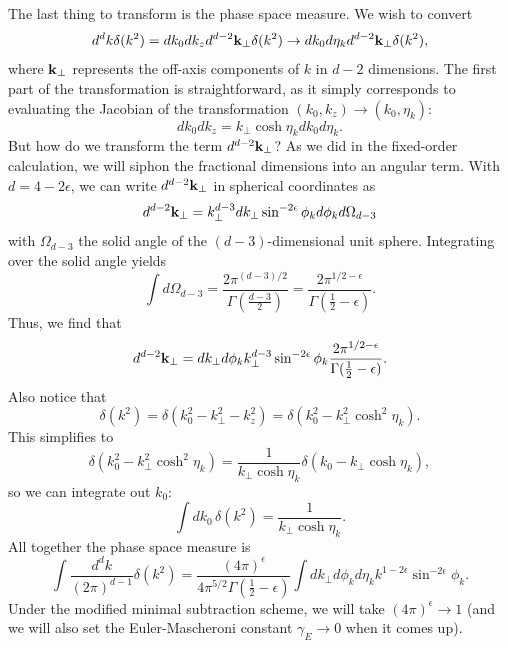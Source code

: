 \documentclass[../thesis.tex]{subfiles}
\begin{document}
	The last thing to transform is the phase space measure. We wish to convert
	\begin{equation}
		d^d k \delta(k^2) = dk_0 dk_z d^{d - 2}\vb{k}_\perp \delta(k^2) \to dk_0 d\eta_{k} d^{d - 2}\vb{k}_\perp \delta(k^2),
	\end{equation}
	where $\vb{k}_\perp$ represents the off-axis components of $k$ in $d - 2$ dimensions. The first part of the transformation is straightforward, as it simply corresponds to evaluating the Jacobian of the transformation $(k_0, k_z) \to (k_0, \eta_k)$:
	\begin{equation}
		dk_0 dk_z = k_\perp \cosh\eta_k dk_0 d\eta_k.
	\end{equation}
	But how do we transform the term $d^{d - 2}\vb{k}_\perp$? As we did in the fixed-order calculation, we will siphon the fractional dimensions into an angular term. With $d = 4 - 2\epsilon$, we can write $d^{d -2}\vb{k}_\perp$ in spherical coordinates as
	\begin{equation}
		d^{d - 2} \vb{k}_\perp = k_\perp^{d - 3} dk_\perp \sin^{-2\epsilon}\phi_k d\phi_k d\Omega_{d - 3}
	\end{equation}
	with $\Omega_{d - 3}$ the solid angle of the $(d - 3)$-dimensional unit sphere. Integrating over the solid angle yields \cite{schwartz_quantum_2014}
	\begin{equation}
		\int d\Omega_{d - 3} = \frac{2\pi^{(d - 3)/2}}{\Gamma(\frac{d - 3}{2})} = \frac{2\pi^{1/2 - \epsilon}}{\Gamma(\frac{1}{2} - \epsilon)}.
	\end{equation}
	Thus, we find that
	\begin{equation}
		d^{d - 2}\vb{k}_\perp = dk_\perp d\phi_k k_\perp^{d - 3} \sin^{-2\epsilon}\phi_k \frac{2\pi^{1/2 - \epsilon}}{\Gamma(\frac{1}{2} - \epsilon)}.
	\end{equation}
	Also notice that
	\begin{equation}
		\delta(k^2) = \delta(k_0^2 - k_\perp^2 - k_z^2) = \delta(k_0^2 - k_\perp^2 \cosh^2\eta_k).
	\end{equation}
	This simplifies to
	\begin{equation}
		\delta(k_0^2 - k_\perp^2 \cosh^2\eta_k) = \frac{1}{k_\perp \cosh\eta_k}\delta(k_0 - k_\perp \cosh\eta_k),
	\end{equation}
	so we can integrate out $k_0$:
	\begin{equation}
		\int dk_0 \, \delta(k^2) = \frac{1}{k_\perp \cosh\eta_k}.
	\end{equation}
	All together the phase space measure is
	\begin{equation}\label{all-eq:phase space measure specific coords}
		\int \frac{d^d k}{(2 \pi)^{d - 1}} \delta(k^2) = \frac{(4\pi)^{\epsilon}}{4 \pi^{5/2} \Gamma(\frac{1}{2} - \epsilon)} \int dk_\perp d\phi_k d\eta_k k^{1 - 2\epsilon} \sin^{-2\epsilon} \phi_k.
	\end{equation}
	Under the modified minimal subtraction scheme, we will take $(4\pi)^\epsilon \to 1$ (and we will also set the Euler-Mascheroni constant $\gamma_E \to 0$ when it comes up).
\end{document}
